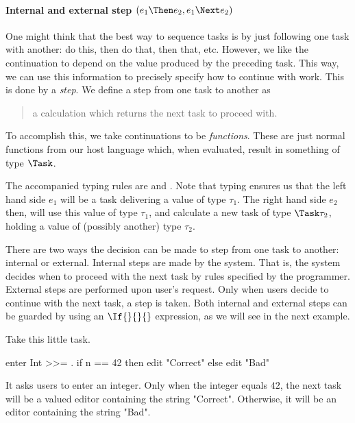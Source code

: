 \paragraph{Internal and external step $(e_1 \Then e_2, e_1 \Next e_2)$}

One might think that the best way to sequence tasks is by just following one task with another:
do this, then do that, then that, etc.
However, we like the continuation to depend on the value produced by the preceding task.
This way, we can use this information to precisely specify how to continue with work.
This is done by a \emph{step}.
We define a step from one task to another as
\begin{quote}
  a calculation which returns the next task to proceed with.
\end{quote}

To accomplish this,
we take continuations to be \emph{functions}.
These are just normal functions from our host language which,
when evaluated, result in something of type $\Task$.

The accompanied typing rules are  and .
Note that typing ensures us that the left hand side $e_1$ will be a task delivering a value of type $\tau_1$.
The right hand side $e_2$ then, will use this value of type $\tau_1$,
and calculate a new task of type $\Task \tau_2$,
holding a value of (possibly another) type $\tau_2$.

There are two ways the decision can be made to step from one task to another:
internal or external.
Internal steps are made by the system.
That is, the system decides when to proceed with the next task by rules specified by the programmer.
External steps are performed upon user's request.
Only when users decide to continue with the next task,
a step is taken.
Both internal and external steps can be guarded by using an $\If{}{}{}$ expression,
as we will see in the next example.



\begin{example}
\label{exm:conditions}

Take this little task.
\begin{TASK}
  enter Int >>= \n. if n == 42 then edit "Correct" else edit "Bad"
\end{TASK}
It asks users to enter an integer.
Only when the integer equals $42$, the next task will be a valued editor containing the string "Correct".
Otherwise, it will be an editor containing the string "Bad".

\end{example}




